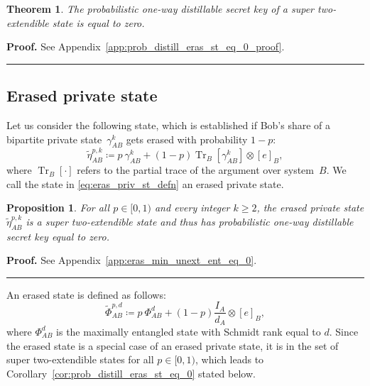 \documentclass[twocolumn,letterpaper, dvipsnames,allowtoday, accepted = 2025-12-31]{quantumarticle}
\newtheorem{theorem}{Theorem}
\newtheorem{proposition}{Proposition}
\newenvironment{proof}[1][Proof]{\noindent\textbf{#1.} }{\ \rule{0.5em}{0.5em}}
\begin{document}
\begin{theorem}\label{theo:prob_distill_ads_eq_0}
    The probabilistic one-way distillable secret key of a super two-extendible state is equal to zero.
\end{theorem}

\begin{proof}
    See Appendix~\ref{app:prob_distill_eras_st_eq_0_proof}.
\end{proof}



\subsection{Erased private state}

Let us consider the following state, which is established if Bob's share of a bipartite private state~$\gamma^k_{AB}$ gets erased with probability $1-p$:
\begin{equation}\label{eq:eras_priv_st_defn}
    \widetilde{\eta}^{p,k}_{AB} \coloneqq p~\gamma^k_{AB} + (1-p)\operatorname{Tr}_B\!\left[\gamma^k_{AB}\right]\otimes [e]_B,
\end{equation}
where $\operatorname{Tr}_B\!\left[\cdot\right]$ refers to the partial trace of the argument over system~$B$. We call the state in \eqref{eq:eras_priv_st_defn} an erased private state.

\begin{proposition}\label{lem:eras_min_unext_ent_eq_0}
    For all $p \in [0,1)$ and every integer $k \geq 2$, the erased private state $\widetilde{\eta}^{p,k}_{AB}$ is a super two-extendible state and thus has probabilistic one-way distillable secret key equal to zero. 
\end{proposition}

\begin{proof}
    See Appendix~\ref{app:eras_min_unext_ent_eq_0}.
\end{proof}

\medskip

An erased state is defined as follows:
\begin{equation}\label{eq:eras_st_defn}
    \widetilde{\Phi}^{p,d}_{AB} \coloneqq p~\Phi^d_{AB} + (1-p)\frac{I_A}{d_A}\otimes [e]_B,
\end{equation}
where $\Phi^d_{AB}$ is the maximally entangled state with Schmidt rank equal to $d$. Since the erased state is a special case of an erased private state, it is in the set of super two-extendible states for all $p\in [0,1)$, which leads to Corollary~\ref{cor:prob_distill_eras_st_eq_0} stated below. 
\end{document}
